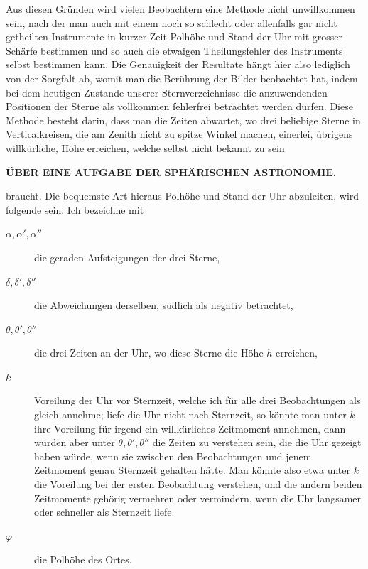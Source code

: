 Aus diesen Gründen wird vielen Beobachtern eine Methode nicht unwillkommen
sein, nach der man auch mit einem noch so schlecht oder allenfalls gar
nicht getheilten Instrumente in kurzer Zeit Polhöhe und Stand der Uhr mit
grosser Schärfe bestimmen und so auch die etwaigen Theilungsfehler des Instruments
selbst bestimmen kann. Die Genauigkeit der Resultate hängt hier also
lediglich von der Sorgfalt ab, womit man die Berührung der Bilder beobachtet
hat, indem bei dem heutigen Zustande unserer Sternverzeichnisse die anzuwendenden
Positionen der Sterne als vollkommen fehlerfrei betrachtet werden dürfen.
Diese Methode besteht darin, dass man die Zeiten abwartet, wo drei beliebige
Sterne in Verticalkreisen, die am Zenith nicht zu spitze Winkel machen, einerlei,
übrigens willkürliche, Höhe erreichen, welche selbst nicht bekannt zu sein\par
\GaussVIGathering{}{17\textsuperscript{*}}
\par\clearpage
\thispagestyle{empty}
\noindent{}%
%
\parbox[t]{\dimexpr\linewidth-24mm\relax}{\centering\fontsize{8.5}{10}\selectfont\bfseries ÜBER EINE AUFGABE DER SPHÄRISCHEN ASTRONOMIE.\par}%
\makebox[12mm][r]{}\par\nobreak\medskip
\setlength{\abovedisplayskip}{6pt plus 2pt minus 2pt}
\setlength{\belowdisplayskip}{6pt plus 2pt minus 2pt}
\setlength{\abovedisplayshortskip}{3pt plus 2pt}
\setlength{\belowdisplayshortskip}{4pt plus 2pt minus 1pt}
\noindent braucht. Die bequemste Art hieraus Polhöhe und Stand der Uhr abzuleiten,
wird folgende sein. Ich bezeichne mit
\begin{description}
\item[$\alpha,\alpha',\alpha''$] die geraden Aufsteigungen der drei Sterne,
\item[$\delta,\delta',\delta''$] die Abweichungen derselben, südlich als negativ betrachtet,
\item[$\theta,\theta',\theta''$] die drei Zeiten an der Uhr, wo diese Sterne die Höhe $h$ erreichen,
\item[$k$] Voreilung der Uhr vor Sternzeit, welche ich für alle drei Beobachtungen
als gleich annehme; liefe die Uhr nicht nach Sternzeit, so könnte
man unter $k$ ihre Voreilung für irgend ein willkürliches Zeitmoment annehmen,
dann würden aber unter $\theta,\theta',\theta''$ die Zeiten zu verstehen sein,
die die Uhr gezeigt haben würde, wenn sie zwischen den Beobachtungen
und jenem Zeitmoment genau Sternzeit gehalten hätte. Man könnte
also etwa unter $k$ die Voreilung bei der ersten Beobachtung verstehen,
und die andern beiden Zeitmomente gehörig vermehren oder vermindern,
wenn die Uhr langsamer oder schneller als Sternzeit liefe.
\item[$\varphi$] die Polhöhe des Ortes.
\end{description}
